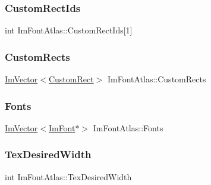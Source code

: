 \hypertarget{struct_im_font_atlas_a608ad12c2ccf1eed97b63454e52ccbe8}{}\label{struct_im_font_atlas_a608ad12c2ccf1eed97b63454e52ccbe8} 
\subsubsection{\texorpdfstring{Custom\+Rect\+Ids}{CustomRectIds}}
{\footnotesize\ttfamily int Im\+Font\+Atlas\+::\+Custom\+Rect\+Ids\mbox{[}1\mbox{]}}

\hypertarget{struct_im_font_atlas_a6289931d958f734fdc2ac1fadec99577}{}\label{struct_im_font_atlas_a6289931d958f734fdc2ac1fadec99577} 
\subsubsection{\texorpdfstring{Custom\+Rects}{CustomRects}}
{\footnotesize\ttfamily \hyperlink{class_im_vector}{Im\+Vector}$<$\hyperlink{struct_im_font_atlas_1_1_custom_rect}{Custom\+Rect}$>$ Im\+Font\+Atlas\+::\+Custom\+Rects}

\hypertarget{struct_im_font_atlas_a0198aeb17ef8bb810ccc8db103b93b1f}{}\label{struct_im_font_atlas_a0198aeb17ef8bb810ccc8db103b93b1f} 
\subsubsection{\texorpdfstring{Fonts}{Fonts}}
{\footnotesize\ttfamily \hyperlink{class_im_vector}{Im\+Vector}$<$\hyperlink{struct_im_font}{Im\+Font}$\ast$$>$ Im\+Font\+Atlas\+::\+Fonts}

\hypertarget{struct_im_font_atlas_aa1d62d7da5633f894dbe881547e9de7c}{}\label{struct_im_font_atlas_aa1d62d7da5633f894dbe881547e9de7c} 
\subsubsection{\texorpdfstring{Tex\+Desired\+Width}{TexDesiredWidth}}
{\footnotesize\ttfamily int Im\+Font\+Atlas\+::\+Tex\+Desired\+Width}

